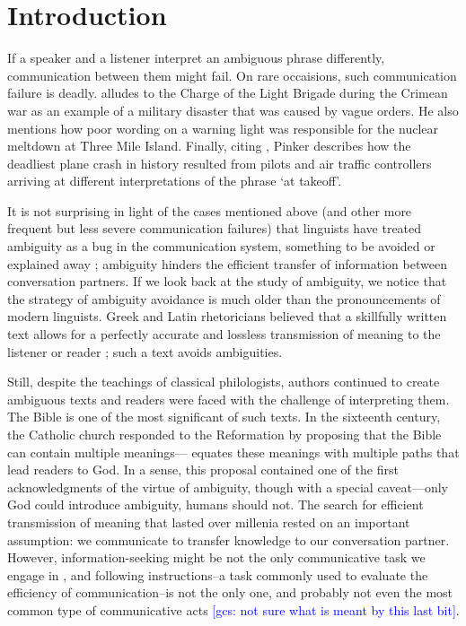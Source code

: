 \documentclass[10pt,a4paper]{article}
\newcommand{\gcs}[1]{\textcolor{blue}{[gcs: #1]}}
\begin{document}
\section{Introduction}

If a speaker and a listener interpret an ambiguous phrase differently, communication between them might fail. On rare occaisions, such communication failure is deadly.  alludes to the Charge of the Light Brigade during the Crimean war as an example of a military disaster that was caused by vague orders. He also mentions how poor wording on a warning light was responsible for the nuclear meltdown at Three Mile Island. Finally, citing , Pinker describes how the deadliest plane crash in history resulted from pilots and air traffic controllers arriving at different interpretations of the phrase `at takeoff'.

It is not surprising in light of the cases mentioned above (and other more frequent but less severe communication failures) that linguists have treated ambiguity as a bug in the communication system, something to be avoided or explained away  \cite{grice1975,chomsky2002minimalism}; ambiguity hinders the efficient transfer of information between conversation partners.
If we look back at the study of ambiguity, we notice that the strategy of ambiguity avoidance is much older than the pronouncements of modern linguists. 
Greek and Latin rhetoricians believed that a skillfully written text allows for a perfectly accurate and lossless transmission of meaning to the listener or reader \cite{ossarichardson2019}; such a text avoids ambiguities.

Still, despite the teachings of classical philologists, authors continued to  create ambiguous texts and readers were faced with the challenge of interpreting them. The Bible is one of the most significant of such texts. In the sixteenth century, the Catholic church responded to the Reformation by proposing that the Bible can contain multiple meanings--- equates these meanings with multiple paths that lead readers to God. In a sense, this proposal contained one of the first acknowledgments of the virtue of ambiguity, though with a  special caveat---only God could introduce ambiguity, humans should not. The search for efficient transmission of meaning that lasted over millenia rested on an important assumption: we communicate to transfer knowledge to our conversation partner. However, information-seeking might be not the only communicative task we engage in \cite{markova1995preface}, and following instructions--a task commonly used to evaluate the efficiency of communication--is not the only one, and probably not even the most common type of communicative acts \cite{foppa1995mutual} \gcs{not sure what is meant by this last bit}. 
\end{document}
